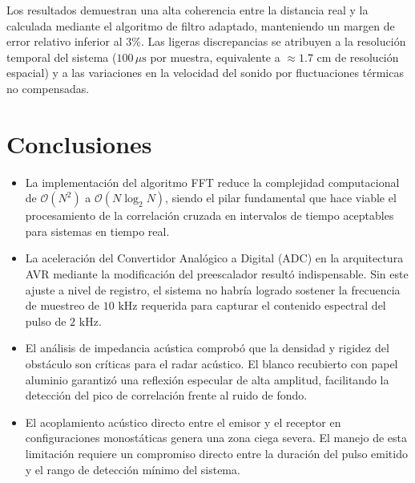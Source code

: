 \documentclass[conference]{IEEEtran}
\begin{document}
Los resultados demuestran una alta coherencia entre la distancia real y la calculada mediante el algoritmo de filtro adaptado, manteniendo un margen de error relativo inferior al $3\%$. Las ligeras discrepancias se atribuyen a la resolución temporal del sistema ($100\,\mu\text{s}$ por muestra, equivalente a $\approx 1.7\text{ cm}$ de resolución espacial) y a las variaciones en la velocidad del sonido por fluctuaciones térmicas no compensadas.

\section{Conclusiones}
\begin{itemize}
    \item La implementación del algoritmo FFT reduce la complejidad computacional de $\mathcal{O}(N^2)$ a $\mathcal{O}(N \log_2 N)$, siendo el pilar fundamental que hace viable el procesamiento de la correlación cruzada en intervalos de tiempo aceptables para sistemas en tiempo real.
    \item La aceleración del Convertidor Analógico a Digital (ADC) en la arquitectura AVR mediante la modificación del preescalador resultó indispensable. Sin este ajuste a nivel de registro, el sistema no habría logrado sostener la frecuencia de muestreo de $10\text{ kHz}$ requerida para capturar el contenido espectral del pulso de $2\text{ kHz}$.
    \item El análisis de impedancia acústica comprobó que la densidad y rigidez del obstáculo son críticas para el radar acústico. El blanco recubierto con papel aluminio garantizó una reflexión especular de alta amplitud, facilitando la detección del pico de correlación frente al ruido de fondo.
    \item El acoplamiento acústico directo entre el emisor y el receptor en configuraciones monostáticas genera una zona ciega severa. El manejo de esta limitación requiere un compromiso directo entre la duración del pulso emitido y el rango de detección mínimo del sistema.
\end{itemize}
\end{document}
